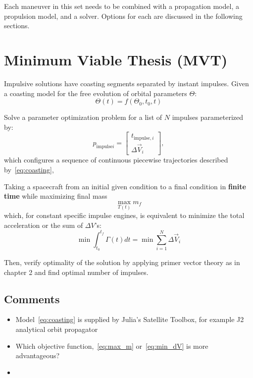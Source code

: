 Each maneuver in this set needs to be combined with a propagation model, a propulsion model, and a solver. Options for each are discussed in the following sections.




\section{Minimum Viable Thesis (MVT)}

Impulsive solutions have coasting segments separated by instant impulses. Given a coasting model for the free evolution of orbital parameters \(\Theta\):
\begin{equation} \label{eq:coasting}
    \Theta(t) = f(\Theta_0, t_0, t)
\end{equation}

Solve a parameter optimization problem for a list of \(N\) impulses parameterized by:
\begin{equation} 
    p_{\text{impulse}i} = \begin{bmatrix}
        t_{\text{impulse},i} \\
        \Delta \vec{V}_i
    \end{bmatrix},
\end{equation}
which configures a sequence of continuous piecewise trajectories described by~\eqref{eq:coasting},

Taking a spacecraft from an initial given condition to a final condition in \textbf{finite time} while maximizing final mass
\begin{equation} \label{eq:max_m}
    \max_{T(t)} m_f 
\end{equation}
which, for constant specific impulse engines, is equivalent to minimize the total acceleration or the sum of \(\Delta V\)'s:
\begin{equation} \label{eq:min_dV}
    \min \int_{t_0}^{t_f} \Gamma(t) dt = \min \sum_{i=1}^N \Delta \vec{V}_i
\end{equation}

Then, verify optimality of the solution by applying primer vector theory as in \cite{Conway_2010} chapter 2 and find optimal number of impulses.

\subsection{Comments}

\begin{itemize}
    \item Model~\eqref{eq:coasting} is supplied by Julia's Satellite Toolbox, for example J2 analytical orbit propagator
    \item Which objective function,~\eqref{eq:max_m} or~\eqref{eq:min_dV} is more advantageous?
    \item 
\end{itemize}

